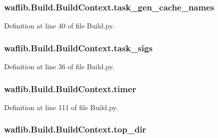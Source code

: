 \subsubsection[{\texorpdfstring{task\+\_\+gen\+\_\+cache\+\_\+names}{task_gen_cache_names}}]{\setlength{\rightskip}{0pt plus 5cm}waflib.\+Build.\+Build\+Context.\+task\+\_\+gen\+\_\+cache\+\_\+names}\hypertarget{classwaflib_1_1_build_1_1_build_context_af36722ba96a65662c05c1a21736174c4}{}\label{classwaflib_1_1_build_1_1_build_context_af36722ba96a65662c05c1a21736174c4}


Definition at line 40 of file Build.\+py.

\subsubsection[{\texorpdfstring{task\+\_\+sigs}{task_sigs}}]{\setlength{\rightskip}{0pt plus 5cm}waflib.\+Build.\+Build\+Context.\+task\+\_\+sigs}\hypertarget{classwaflib_1_1_build_1_1_build_context_a3cf2fca35f448164b008964c0e8af14d}{}\label{classwaflib_1_1_build_1_1_build_context_a3cf2fca35f448164b008964c0e8af14d}


Definition at line 36 of file Build.\+py.

\subsubsection[{\texorpdfstring{timer}{timer}}]{\setlength{\rightskip}{0pt plus 5cm}waflib.\+Build.\+Build\+Context.\+timer}\hypertarget{classwaflib_1_1_build_1_1_build_context_a337ba036f18b924e394a26a03c7e72a0}{}\label{classwaflib_1_1_build_1_1_build_context_a337ba036f18b924e394a26a03c7e72a0}


Definition at line 111 of file Build.\+py.

\subsubsection[{\texorpdfstring{top\+\_\+dir}{top_dir}}]{\setlength{\rightskip}{0pt plus 5cm}waflib.\+Build.\+Build\+Context.\+top\+\_\+dir}\hypertarget{classwaflib_1_1_build_1_1_build_context_a354ed67655d084a2679fbb20edd8dae4}{}\label{classwaflib_1_1_build_1_1_build_context_a354ed67655d084a2679fbb20edd8dae4}



